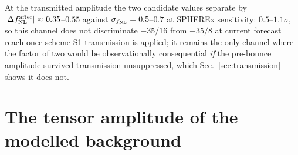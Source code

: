 \documentclass[aps,prd,twocolumn,superscriptaddress,nofootinbib,longbibliography]{revtex4-2}
\newcommand{\fnl}{f_{\rm NL}}
\begin{document}
At the transmitted amplitude the two candidate values separate by
$|\Delta\fnl^{\rm after}|\approx0.35$--$0.55$ against $\sigma_{\fnl}=0.5$--$0.7$
at SPHEREx sensitivity: $0.5$--$1.1\sigma$, so this channel does not
discriminate $-35/16$ from $-35/8$ at current forecast reach once
scheme-S1 transmission is applied; it remains the only channel where the
factor of two would be observationally consequential \emph{if} the
pre-bounce amplitude survived transmission unsuppressed, which
Sec.~\ref{sec:transmission} shows it does not.

\section{The tensor amplitude of the modelled background}
\label{sec:tensor}
\end{document}
